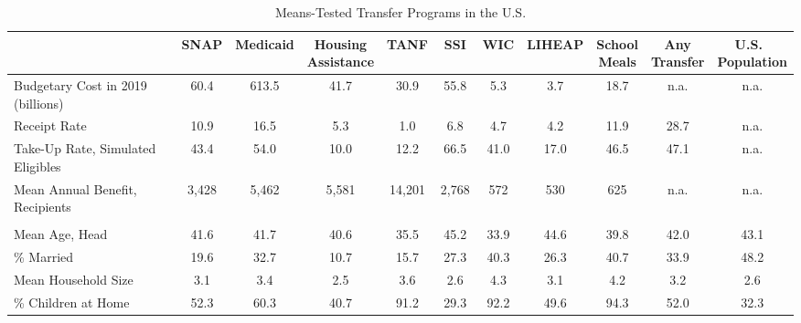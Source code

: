 

\begin{table}[t!]
    \centering
    \caption{Means-Tested Transfer Programs in the U.S.}
    \small
    \label{tab:summstats_transfers}
    \begin{tabular*}{1.36\textwidth}{@{\extracolsep{\fill}}lcccccccccc@{}}
\toprule
                                       & SNAP & Medicaid & \shortstack{ Housing  \\ Assistance } & TANF & SSI & WIC & LIHEAP & \shortstack{School \\ Meals} & \shortstack{Any  \\ Transfer } & \shortstack{U.S.\ \\ Population} \\ \midrule \addlinespace
Budgetary Cost in 2019 (billions)                &  60.4    &   613.5       &        41.7            &  30.9    &  55.8   & 5.3    &    3.7    &      18.7     & n.a. & n.a.        \\
Receipt Rate               & 10.9     &   16.5       &    5.3                &  1.0    &  6.8    &  4.7   &  4.2      &    11.9   & 28.7  & n.a.     \\
Take-Up Rate, Simulated Eligibles               & 43.4     &   54.0       &    10.0                &  12.2    &  66.5    &  41.0   &  17.0      &    46.5   &  47.1  & n.a.     \\
Mean Annual Benefit, Recipients     &   3,428     &   5,462       &    5,581                &  14,201    &  2,768    &  572   &  530      &    625   & n.a.  & n.a.         \\ \addlinespace
\multicolumn{6}{@{}l}{Characteristics of  Households or Heads of Recipient Households}             \\
\quad Mean Age, Head                           &  41.6     &   41.7       &    40.6                &  35.5    &  45.2    &  33.9   &  44.6      &    39.8   & 42.0  & 43.1          \\
\quad \% Married                             &  19.6     &   32.7       &    10.7                &  15.7    &  27.3    &  40.3   &  26.3      &    40.7   & 33.9  & 48.2        \\
\quad Mean Household Size                           &  3.1     &   3.4       &    2.5                &  3.6    &  2.6    &  4.3   &  3.1      &    4.2   & 3.2  & 2.6          \\
\quad \% Children at Home                    &   52.3     &   60.3       &    40.7                &  91.2    &  29.3    &  92.2   &  49.6      &    94.3   & 52.0  & 32.3        \\

\end{tabular*}
\end{table}
